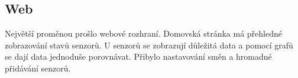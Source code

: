 \subsection{Web}
Největší proměnou prošlo webové rozhraní. Domovská stránka má přehledné zobrazování stavů senzorů. U senzorů se zobrazují důležitá data a pomocí grafů se dají data jednoduše porovnávat.
Přibylo nastavování směn a hromadné přidávání senzorů.







\newpage